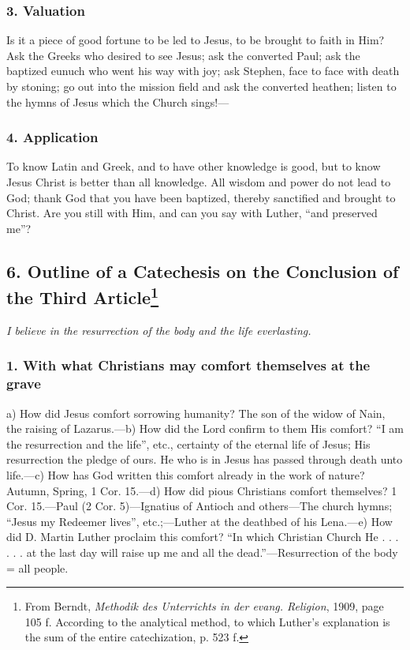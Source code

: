 \subsubsection{3. Valuation} Is it a piece of good fortune to be led to Jesus, to be brought to faith in Him? Ask the Greeks who desired to see Jesus; ask the converted Paul; ask the baptized eunuch who went his way with joy; ask Stephen, face to face with death by stoning; go out into the mission field and ask the converted heathen; listen to the hymns of Jesus which the Church sings!—

\subsubsection{4. Application} To know Latin and Greek, and to have other knowledge is good, but to know Jesus Christ is better than all knowledge.
All wisdom and power do not lead to God; thank God that you have been baptized, thereby sanctified and brought to Christ. Are you still with Him, and can you say with Luther, “and preserved me”?

\subsection[6. The Conclusion of the Third Article]{6. Outline of a Catechesis on the Conclusion of the Third Article\footnote{From Berndt, \emph{Methodik des Unterrichts in der evang. Religion}, 1909, page 105 f. According to the analytical method, to which Luther’s explanation is the sum of the entire catechization, p. 523 f.}}

\emph{I believe in the resurrection of the body and the life everlasting.}

\subsubsection{1. With what Christians may comfort themselves at the grave}

a) How did Jesus comfort sorrowing humanity? The son of the widow of Nain, the raising of Lazarus.—b) How did the Lord confirm to them His comfort? “I am the resurrection and the life”, etc., certainty of the eternal life of Jesus; His resurrection the pledge of ours. He who is in Jesus has passed through death unto life.—c) How has God written this comfort already in the work of nature? Autumn, Spring, 1 Cor. 15.—d) How did pious Christians comfort themselves? 1 Cor. 15.—Paul (2 Cor. 5)—Ignatius of Antioch and others—The church hymns; “Jesus my Redeemer lives”, etc.;—Luther at the deathbed of his Lena.—e) How did D. Martin Luther proclaim this comfort? “In which Christian Church He . . . . . . at the last day will raise up me and all the dead.”—Resurrection of the body = all people.


